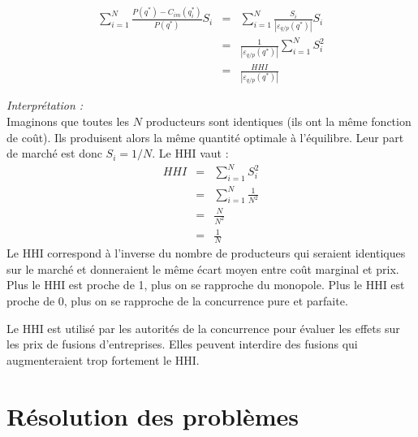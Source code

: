 \documentclass[
  a4paper,
]{book}
\theoremstyle{definition}
\theoremstyle{definition}
\theoremstyle{definition}
\theoremstyle{definition}
\theoremstyle{remark}
\begin{document}
\[
 \begin{array}{rcl}
 \sum_{i=1}^{N}\frac{P(q^*) -C_{im}(q_i^*)}{P(q^*)}S_i &=&\sum_{i=1}^{N} \frac{S_i}{\left|\varepsilon_{q/p}(q^*)\right|}S_i \\
 &=&\frac{1}{\left|\varepsilon_{q/p}(q^*)\right|}\sum_{i=1}^NS_i^2\\
 &=&\frac{HHI}{\left|\varepsilon_{q/p}(q^*)\right|}
 \end{array}
 \]

\emph{Interprétation :}\\
Imaginons que toutes les \(N\) producteurs sont identiques (ils ont la même fonction de coût).
Ils produisent alors la même quantité optimale à l'équilibre.
Leur part de marché est donc \(S_i=1/N\).
Le HHI vaut :
\[
\begin{array}{rcl}
HHI&=&\sum_{i=1}^NS_i^2\\
&=&\sum_{i=1}^N\frac{1}{N^2}\\
&=&\frac{N}{N^2} \\
&=&\frac{1}{N}
\end{array}
\]
Le HHI correspond à l'inverse du nombre de producteurs qui seraient identiques sur le marché et donneraient le même écart moyen entre coût marginal et prix.
Plus le HHI est proche de 1, plus on se rapproche du monopole.
Plus le HHI est proche de 0, plus on se rapproche de la concurrence pure et parfaite.

Le HHI est utilisé par les autorités de la concurrence pour évaluer les effets sur les prix de fusions d'entreprises.
Elles peuvent interdire des fusions qui augmenteraient trop fortement le HHI.

\hypertarget{appendix-annexes}{%
\appendix}


\hypertarget{ruxe9solution-des-probluxe8mes}{%
\chapter{Résolution des problèmes}\label{ruxe9solution-des-probluxe8mes}}
\end{document}
